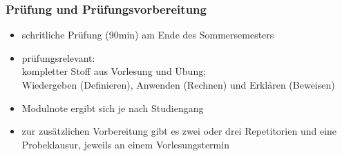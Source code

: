 \documentclass[aspectratio=1610,onlymath]{beamer}
\begin{document}
%


\begin{frame}\frametitle{Prüfung und Prüfungsvorbereitung}
\begin{itemize}
\item schritliche Prüfung (90min) am Ende des Sommersemesters
\item prüfungsrelevant:\\
	kompletter Stoff aus Vorlesung \alert{und} Übung;\\
	Wiedergeben (Definieren), Anwenden (Rechnen) und Erklären (Beweisen)
\item Modulnote ergibt sich je nach Studiengang
\item zur zusätzlichen Vorbereitung gibt es \alert{zwei oder drei Repetitorien} und \alert{eine Probeklausur}, jeweils an einem Vorlesungstermin
\end{itemize}

\end{frame}
\end{document}
